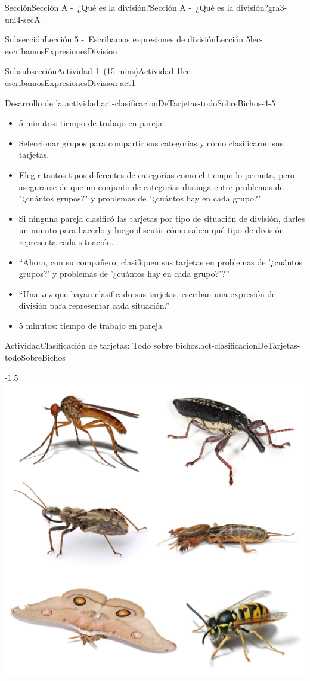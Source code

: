 \documentclass[oneside,10pt,]{article}
\begin{document}
\begin{sectionptx}{Sección}{Sección A -~¿Qué es la división?}{}{Sección A -~¿Qué es la división?}{}{}{gra3-uni4-secA}
\begin{subsectionptx}{Subsección}{Lección 5 -~Escribamos expresiones de división}{}{Lección 5}{}{}{lec-escribamosExpresionesDivision}
\begin{subsubsectionptx}{Subsubsección}{Actividad 1~(15 mins)}{}{Actividad 1}{}{}{lec-escribamosExpresionesDivision-act1}
\begin{paragraphs}{Desarrollo de la actividad.}{act-clasificacionDeTarjetas-todoSobreBichos-4-5}
\begin{itemize}[label=\textbullet]
\item{}5 minutos: tiempo de trabajo en pareja%
\item{}Seleccionar grupos para compartir sus categorías y cómo clasificaron sus tarjetas.%
\item{}Elegir tantos tipos diferentes de categorías como el tiempo lo permita, pero asegurarse de que un conjunto de categorías distinga entre problemas de "¿cuántos grupos?" y problemas de "¿cuántos hay en cada grupo?"%
\item{}Si ninguna pareja clasificó las tarjetas por tipo de situación de división, darles un minuto para hacerlo y luego discutir cómo saben qué tipo de división representa cada situación.%
\item{}``Ahora, con su compañero, clasifiquen sus tarjetas en problemas de '¿cuántos grupos?' y problemas de '¿cuántos hay en cada grupo?'?''%
\item{}``Una vez que hayan clasificado sus tarjetas, escriban una expresión de división para representar cada situación.''%
\item{}5 minutos: tiempo de trabajo en pareja%
\end{itemize}
\end{paragraphs}%
\begin{activity}{Actividad}{Clasificación de tarjetas: Todo sobre bichos.}{act-clasificacionDeTarjetas-todoSobreBichos}%
\begin{image}{0.3}{0.4}{0.3}{-1.5\baselineskip}%
\includegraphics[width=\linewidth]{external/png-source/v1 3.4.A5 Launch.png}

\end{image}
\end{activity}
\end{subsubsectionptx}
\end{subsectionptx}
\end{sectionptx}
\end{document}
